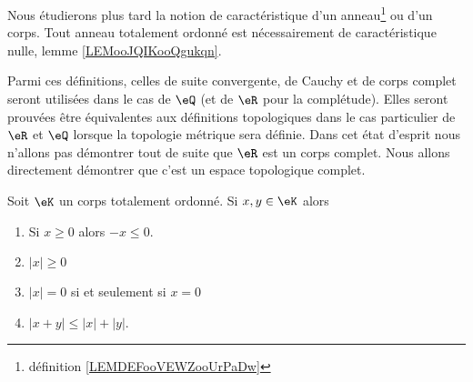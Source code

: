 \begin{remark}
    Nous étudierons plus tard la notion de caractéristique d'un anneau\footnote{définition \ref{LEMDEFooVEWZooUrPaDw}} ou d'un corps. Tout anneau totalement ordonné est nécessairement de caractéristique nulle, lemme \ref{LEMooJQIKooQgukqn}.
\end{remark}

Parmi ces définitions, celles de suite convergente, de Cauchy et de corps complet seront utilisées dans le cas de \( \eQ\) (et de \( \eR\) pour la complétude). Elles seront prouvées être équivalentes aux définitions topologiques dans le cas particulier de \( \eR\) et \( \eQ\) lorsque la topologie métrique sera définie. Dans cet état d'esprit nous n'allons pas démontrer tout de suite que \( \eR\) est un corps complet. Nous allons directement démontrer que c'est un espace topologique complet.

\begin{lemma}  \label{LemooANTJooYxQZDw}
    Soit \( \eK\) un corps totalement ordonné. Si \( x,y\in \eK\) alors
    \begin{enumerate}
        \item       \label{ItemooNVDIooSuiSoB}
            Si \( x\geq 0\) alors \( -x\leq 0\).
        \item
            \( | x |\geq 0\)
        \item
            \( | x |=0\) si et seulement si \( x=0\)
        \item\label{ItemooOMKNooRlanvk}
            \( | x+y |\leq | x |+| y |\).
    \end{enumerate}
\end{lemma}


